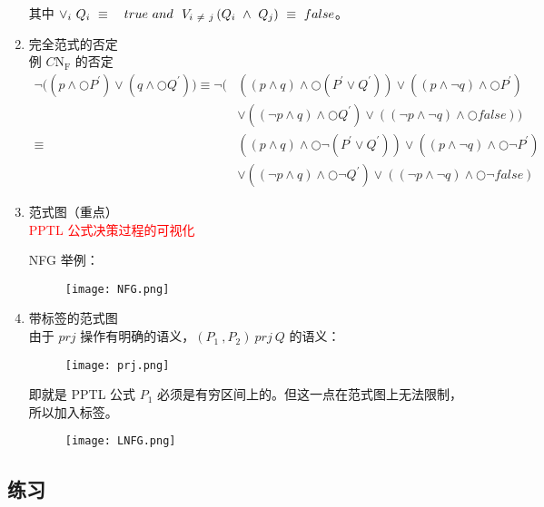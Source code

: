 \begin{enumerate}
  其中 $\vee_{i}~Q_{i}~\equiv~\text~{~true~and~}~V_{i~\neq~j}\left(Q_{i}~\wedge~Q_{j}\right)~\equiv~false$。

  \item 完全范式的否定\\
  例 $C\mathrm{N}_{\mathrm{F}}$ 的否定
  $$\begin{aligned}\neg \big(\left(p \wedge \bigcirc P^{\prime}\right) \vee\left(q \wedge \bigcirc Q^{\prime}\right)\big) \equiv \neg \Big( &\left((p \wedge q) \wedge \bigcirc\left(P^{\prime} \vee Q^{\prime}\right)\right) \vee\left((p \wedge \neg q) \wedge \bigcirc P^{\prime}\right) \\ & \vee\left((\neg p \wedge q) \wedge \bigcirc Q^{\prime}\right) \vee((\neg p \wedge \neg q) \wedge \bigcirc f a l s e)\Big)\\ \equiv &\left((p \wedge q) \wedge \bigcirc\neg\left(P^{\prime} \vee Q^{\prime}\right)\right) \vee\left((p \wedge \neg q) \wedge \bigcirc\neg P^{\prime}\right) \\ & \vee\left((\neg p \wedge q) \wedge \bigcirc \neg Q^{\prime}\right) \vee((\neg p \wedge \neg q) \wedge \bigcirc\neg f a l s e) \end{aligned}$$

  \item 范式图（重点）\\
  \textcolor{red}{PPTL 公式决策过程的可视化}

  NFG 举例：
\begin{figure}[!h]
  \centering
  \texttt{[image: NFG.png]}
\end{figure}

  \item 带标签的范式图 \\
  由于 $prj$ 操作有明确的语义，$(P_1~,P_2)~prj~Q$ 的语义：
\begin{figure}[!h]
  \centering
  \texttt{[image: prj.png]}
\end{figure}

  即就是 PPTL 公式 $P_1$ 必须是有穷区间上的。但这一点在范式图上无法限制，所以加入标签。

\begin{figure}[!h]
  \centering
  \texttt{[image: LNFG.png]}
\end{figure}
\end{enumerate}

\subsection{练习}

